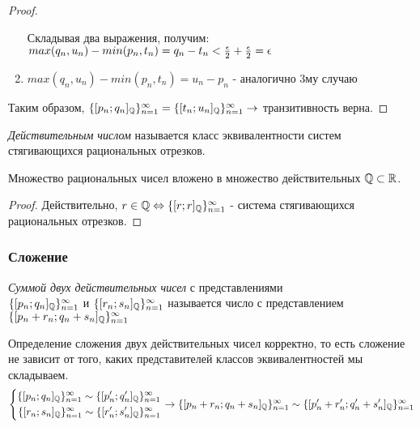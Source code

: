 \begin{proof}
\begin{enumerate}
        Складывая два выражения, получим:
        $max(q_n, u_n) - min(p_n, t_n) = q_n - t_n < \frac{\epsilon}{2} + \frac{\epsilon}{2} = \epsilon$
        \item $max(q_n, u_n) - min(p_n, t_n) = u_n - p_n$ - аналогично 3му случаю
    \end{enumerate}
    Таким образом, $\{[p_n; q_n]_{\mathbb{Q}}\}_{n = 1}^\infty = \{[t_n; u_n]_{\mathbb{Q}}\}_{n = 1}^\infty \rightarrow$ транзитивность верна.
\end{proof}

\begin{definition}
    \textit{Действительным числом} называется класс эквивалентности систем стягивающихся рациональных отрезков.
\end{definition}

\begin{proposition}
    Множество рациональных чисел вложено в множество действительных $\mathbb{Q} \subset \mathbb{R}$.
\end{proposition}

\begin{proof}
    Действительно, $r \in \mathbb{Q} \Leftrightarrow \{[r;r]_{\mathbb{Q}}\}_{n = 1}^\infty$ - система стягивающихся рациональных отрезков.
\end{proof}

\subsubsection{Сложение}

\begin{definition}
    \textit{Суммой двух действительных чисел} с представлениями \\$\{[p_n; q_n]_{\mathbb{Q}}\}_{n = 1}^\infty$ и $\{[r_n; s_n]_{\mathbb{Q}}\}_{n = 1}^\infty$ называется число с представлением $\{[p_n + r_n; q_n + s_n]_{\mathbb{Q}}\}_{n = 1}^\infty$
\end{definition}

\begin{proposition}
    Определение сложения двух действительных чисел корректно, то есть сложение не зависит от того, каких представителей классов эквивалентностей мы складываем.
    $$
    \left\{\begin{aligned}\{[p_n; q_n]_{\mathbb{Q}}\}_{n = 1}^\infty \sim \{[p'_n; q'_n]_{\mathbb{Q}}\}_{n = 1}^\infty \\ 
            \{[r_n; s_n]_{\mathbb{Q}}\}_{n = 1}^\infty \sim \{[r'_n; s'_n]_{\mathbb{Q}}\}_{n = 1}^\infty\end{aligned}\right.
    \rightarrow
    \{[p_n + r_n; q_n + s_n]_{\mathbb{Q}}\}_{n = 1}^\infty \sim \{[p'_n + r'_n; q'_n + s'_n]_{\mathbb{Q}}\}_{n = 1}^\infty
    $$
\end{proposition}

